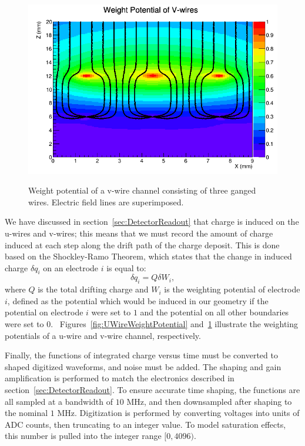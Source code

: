 \begin{figure}
\begin{center}
\includegraphics[keepaspectratio=true,width=\textwidth]{WeightPotContoursV_WithE.png}
\end{center}
\renewcommand{\baselinestretch}{1}
\small\normalsize
\begin{quote}
\caption{Weight potential of a v-wire channel consisting of three ganged wires.  Electric field lines are superimposed.~\cite{MCDocumentRun2a}}
\label{fig:VWireWeightPotential}
\end{quote}
\end{figure}
\renewcommand{\baselinestretch}{2}
\small\normalsize

We have discussed in section~\ref{sec:DetectorReadout} that charge is induced on the u-wires and v-wires; this means that we must record the amount of charge induced at each step along the drift path of the charge deposit.  This is done based on the Shockley-Ramo Theorem, which states that the change in induced charge $\delta q_i$ on an electrode $i$ is equal to:
\begin{equation}
\delta q_i = Q \delta W_i,
\end{equation}
where $Q$ is the total drifting charge and $W_i$ is the weighting potential of electrode $i$, defined as the potential which would be induced in our geometry if the potential on electrode $i$ were set to $1$ and the potential on all other boundaries were set to $0$.~\cite{ShockleyPaper}\cite{1686997}  Figures~\ref{fig:UWireWeightPotential} and~\ref{fig:VWireWeightPotential} illustrate the weighting potentials of a u-wire and v-wire channel, respectively.

Finally, the functions of integrated charge versus time must be converted to shaped digitized waveforms, and noise must be added.  The shaping and gain amplification is performed to match the electronics described in section~\ref{sec:DetectorReadout}.  To ensure accurate time shaping, the functions are all sampled at a bandwidth of $10$ MHz, and then downsampled after shaping to the nominal $1$ MHz.  Digitization is performed by converting voltages into units of ADC counts, then truncating to an integer value.  To model saturation effects, this number is pulled into the integer range $[0, 4096)$.


